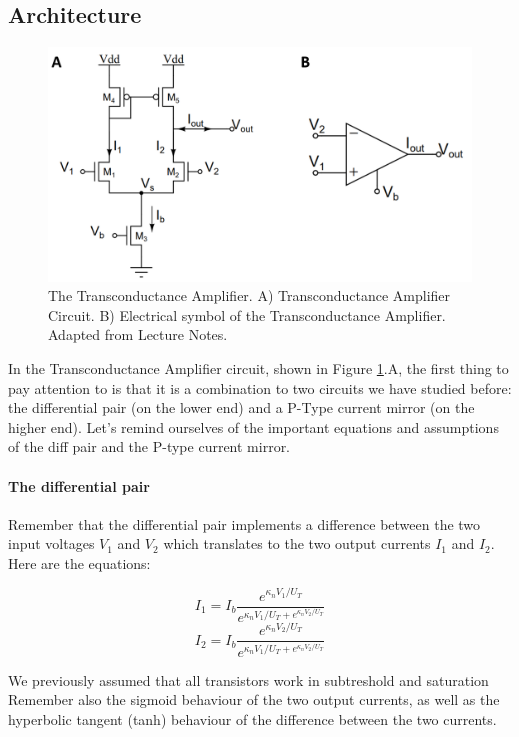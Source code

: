 \subsection{Architecture}
\begin{figure}[H]
    \centering
    \includegraphics[width=0.8\linewidth]{../../Figures/Transconductance_Amplifier.PNG}
    \caption{The Transconductance Amplifier. A) Transconductance Amplifier Circuit. B) Electrical symbol of the Transconductance Amplifier. Adapted from Lecture Notes.}
    \label{fig:transconductance_amplifier}
\end{figure}

In the Transconductance Amplifier circuit, shown in Figure \ref{fig:transconductance_amplifier}.A, the first thing to pay attention to is that it is a combination to two circuits we have studied before: the differential pair (on the lower end) and a P-Type current mirror (on the higher end). Let's remind ourselves of the important equations and assumptions of the diff pair and the P-type current mirror. 
\newline
\paragraph{The differential pair} Remember that the differential pair implements a difference between the two input voltages $V_1$ and $V_2$ which translates to the two output currents $I_1$ and $I_2$. Here are the equations:

\begin{equation}
    I_1 = I_b\frac{e^{\kappa_n V_1/U_T}}{e^{\kappa_n V_1/U_T + e^{\kappa_n V_2/U_T}}}
\end{equation}
\begin{equation}
    I_2 = I_b\frac{e^{\kappa_n V_2/U_T}}{e^{\kappa_n V_1/U_T + e^{\kappa_n V_2/U_T}}}
\end{equation}

We previously assumed that all transistors work in subtreshold and saturation Remember also the sigmoid behaviour of the two output currents, as well as the hyperbolic tangent (tanh) behaviour of the difference between the two currents. 

